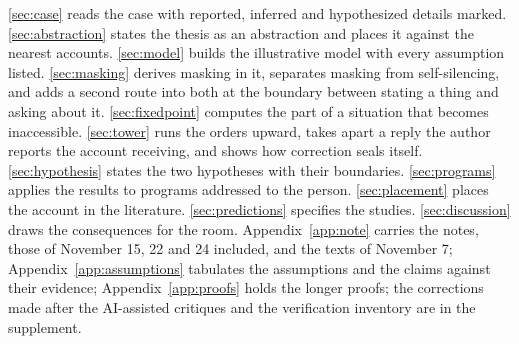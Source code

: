 \autoref{sec:case} reads the case with reported, inferred and hypothesized details marked. \autoref{sec:abstraction} states the thesis as an abstraction and places it against the nearest accounts. \autoref{sec:model} builds the illustrative model with every assumption listed. \autoref{sec:masking} derives masking in it, separates masking from self-silencing, and adds a second route into both at the boundary between stating a thing and asking about it. \autoref{sec:fixedpoint} computes the part of a situation that becomes inaccessible. \autoref{sec:tower} runs the orders upward, takes apart a reply the author reports the account receiving, and shows how correction seals itself. \autoref{sec:hypothesis} states the two hypotheses with their boundaries. \autoref{sec:programs} applies the results to programs addressed to the person. \autoref{sec:placement} places the account in the literature. \autoref{sec:predictions} specifies the studies. \autoref{sec:discussion} draws the consequences for the room. Appendix~\ref{app:note} carries the notes, those of November 15, 22 and 24 included, and the texts of November 7; Appendix~\ref{app:assumptions} tabulates the assumptions and the claims against their evidence; Appendix~\ref{app:proofs} holds the longer proofs; the corrections made after the AI-assisted critiques and the verification inventory are in the supplement.
